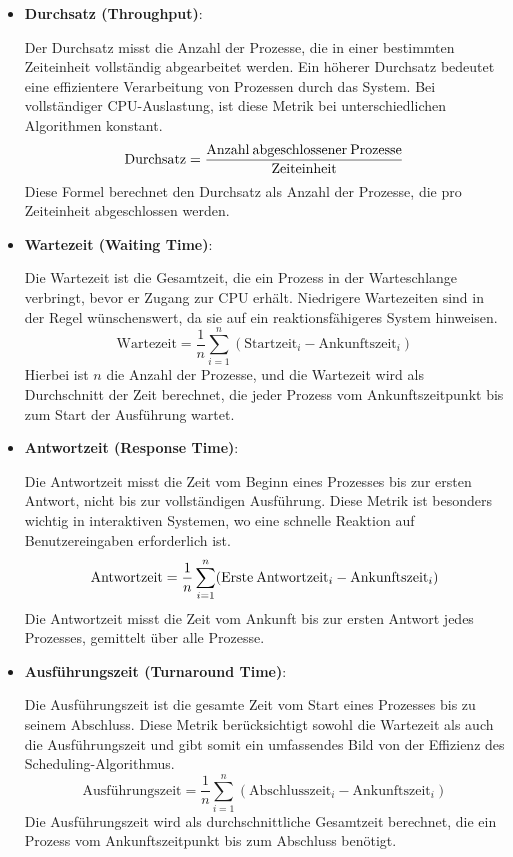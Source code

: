\begin{itemize}
	\item \textbf{Durchsatz (Throughput)}: 
	
	Der Durchsatz misst die Anzahl der Prozesse, die in einer bestimmten Zeiteinheit vollständig abgearbeitet werden. Ein höherer Durchsatz bedeutet eine effizientere Verarbeitung von Prozessen durch das System. Bei vollständiger \ac{CPU}-Auslastung, ist diese Metrik bei unterschiedlichen Algorithmen konstant. 
	\[ \text{Durchsatz} = \frac{\text{Anzahl\:abgeschlossener\:Prozesse}}{\text{Zeiteinheit}} \]
	Diese Formel berechnet den Durchsatz als Anzahl der Prozesse, die pro Zeiteinheit abgeschlossen werden.
	
	\item \textbf{Wartezeit (Waiting Time)}: 
	
	Die Wartezeit ist die Gesamtzeit, die ein Prozess in der Warteschlange verbringt, bevor er Zugang zur \ac{CPU} erhält. Niedrigere Wartezeiten sind in der Regel wünschenswert, da sie auf ein reaktionsfähigeres System hinweisen.
	\[ \text{Wartezeit} = \frac{1}{n} \sum_{i=1}^{n} (\text{Startzeit}_i - \text{Ankunftszeit}_i) \]
	Hierbei ist \( n \) die Anzahl der Prozesse, und die Wartezeit wird als Durchschnitt der Zeit berechnet, die jeder Prozess vom Ankunftszeitpunkt bis zum Start der Ausführung wartet.
	
	\item \textbf{Antwortzeit (Response Time)}: 
	
	Die Antwortzeit misst die Zeit vom Beginn eines Prozesses bis zur ersten Antwort, nicht bis zur vollständigen Ausführung. Diese Metrik ist besonders wichtig in interaktiven Systemen, wo eine schnelle Reaktion auf Benutzereingaben erforderlich ist.
	\[ \text{Antwortzeit} = \frac{1}{n} \sum_{i=1}^{n} (\text{Erste\:Antwortzeit}_i - \text{Ankunftszeit}_i) \]
	Die Antwortzeit misst die Zeit vom Ankunft bis zur ersten Antwort jedes Prozesses, gemittelt über alle Prozesse.
	
	\item \textbf{Ausführungszeit (Turnaround Time)}: 
	
	Die Ausführungszeit ist die gesamte Zeit vom Start eines Prozesses bis zu seinem Abschluss. Diese Metrik berücksichtigt sowohl die Wartezeit als auch die Ausführungszeit und gibt somit ein umfassendes Bild von der Effizienz des Scheduling-Algorithmus.
	\[ \text{Ausführungszeit} = \frac{1}{n} \sum_{i=1}^{n} (\text{Abschlusszeit}_i - \text{Ankunftszeit}_i) \]
	Die Ausführungszeit wird als durchschnittliche Gesamtzeit berechnet, die ein Prozess vom Ankunftszeitpunkt bis zum Abschluss benötigt.
	

\end{itemize}
